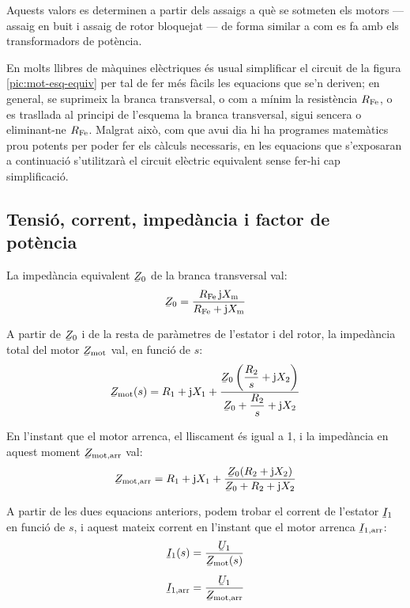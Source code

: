 Aquests valors es determinen a partir dels assaigs a què se sotmeten els motors --- assaig en buit i assaig de rotor bloquejat --- de forma similar a com es fa amb els transformadors de potència.

En molts llibres de màquines elèctriques és usual simplificar el circuit de la figura  \vref{pic:mot-esq-equiv} per tal de fer més fàcils les equacions que se'n deriven; en general, se suprimeix la branca transversal, o com a mínim la resistència $R_\mathrm{Fe}$, o es trasllada al principi de l'esquema la branca transversal, sigui sencera o eliminant-ne  $R_\mathrm{Fe}$. Malgrat això, com que avui dia hi ha programes matemàtics prou potents per poder fer els càlculs necessaris, en les equacions que s'exposaran a continuació s'utilitzarà el circuit elèctric equivalent sense fer-hi cap simplificació.

\subsection{Tensió, corrent, impedància i factor de potència}\label{sec:mot-u-c-i}

La impedància equivalent $\cmplx{Z}_0$ de la branca transversal val:
\begin{equation}\label{eq:mot-Z0}
    \cmplx{Z}_0 = \frac{R\ped{Fe} \, \ju X\ped{m}}{ R\ped{Fe} + \ju X\ped{m}}
\end{equation}

A partir de $\cmplx{Z}_0$ i de la resta de paràmetres de l'estator i del rotor, la impedància total del motor $\cmplx{Z}\ped{mot}$ val,  en funció de $s$:
\begin{equation}\label{eq:mot-Zmot}\index{motors d'inducció!impedància}
    \cmplx{Z}\ped{mot}(s) = R_1 + \ju X_1 + \frac{\cmplx{Z}_0 \left( \dfrac{R_2}{s} + \ju X_2\right)}{\cmplx{Z}_0 +  \dfrac{R_2}{s} + \ju X_2}
\end{equation}

En l'instant que el motor arrenca, el lliscament és igual a 1, i la impedància en aquest moment $\cmplx{Z}\ped{mot,arr}$ val:
\begin{equation}\label{eq:z-mot-arr}
    \cmplx{Z}\ped{mot,arr} = R_1 + \ju X_1 + \frac{\cmplx{Z}_0 ( R_2 + \ju X_2)}{\cmplx{Z}_0 +  R_2 + \ju X_2}
\end{equation}

A partir de les dues equacions anteriors, podem trobar el corrent de l'estator  $\cmplx{I}_1$ en funció de $s$, i aquest mateix corrent en l'instant que el motor arrenca $\cmplx{I}\ped{1,arr}$:
\begin{subequations}\index{motors d'inducció!corrent d'arrencada}\index{motors d'inducció!corrent}
\begin{align}
    \cmplx{I}_1(s) &= \frac{\cmplx{U}_1}{\cmplx{Z}\ped{mot}(s)}\label{eq:I1-mot} \\[1ex]
    \cmplx{I}\ped{1,arr} &= \frac{\cmplx{U}_1}{\cmplx{Z}\ped{mot,arr}}\label{eq:I1-mot-arr}
\end{align}
\end{subequations}

